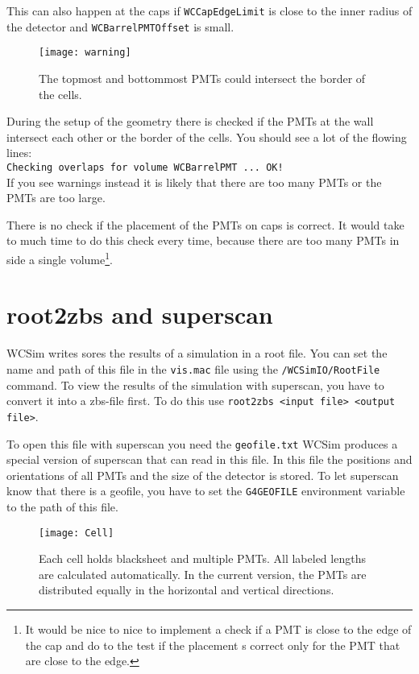 This can also happen at the caps if \texttt{WCCapEdgeLimit} is close to the inner radius of the detector and \texttt{WCBarrelPMTOffset} is small.

\begin{figure}
  \begin{center}
\texttt{[image: warning]}
  \end{center}
\caption{The topmost and bottommost PMTs could  intersect the border of the cells.} \label{fig:warning}
\end{figure}

During the setup of the geometry there is checked if the PMTs at the wall intersect each other or the border of the cells. You should see a lot of the flowing lines:\\
\texttt{Checking overlaps for volume WCBarrelPMT ... OK!}\\
If you see warnings instead it is likely that there are too many PMTs or the PMTs are too large.

There is no check if the placement of the PMTs on caps is correct. It would take to much time to do this check every time, because there are too many PMTs in side a single volume\footnote{It would be nice to nice to implement a check if a PMT is close to the edge of the cap and do to the test if the placement s correct only for the PMT that are close to the edge.}. 
 
 


\section{root2zbs and superscan}
WCSim writes sores the results of a simulation in a root file. You can set the name and path of this file in the \texttt{vis.mac} file using the \texttt{/WCSimIO/RootFile} command. To view the results of the simulation with superscan, you have to convert it into a zbs-file first. To do this use \texttt{root2zbs <input file> <output file>}.

To open this file with superscan you need the \texttt{geofile.txt} WCSim produces a special version of superscan that can read in this file. In this file the positions and orientations of all PMTs and the size of the detector is stored. To let superscan know that there is a geofile, you have to set the \texttt{G4GEOFILE} environment variable to the path of this file.


\begin{figure}
  \begin{center}
\texttt{[image: Cell]}
  \end{center}
\caption{Each cell holds blacksheet and multiple PMTs. All labeled lengths are calculated automatically. In the current version, the PMTs are distributed equally in the horizontal and vertical directions.}
\end{figure}

